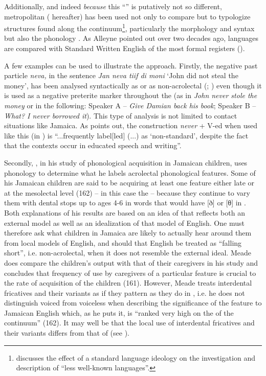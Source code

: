 Additionally, and indeed \textit{because} this “” is putatively not so different, metropolitan  ( hereafter) has been used not only to compare but to typologize structures found along the continuum\footnote{\citet[33 in particular]{Milroy1999} discusses the effect of a standard language ideology on the investigation and description of “less well-known languages”.}, particularly the morphology and syntax but also the phonology \citep[575]{Wells1982c}.  As Alleyne pointed out over two decades ago,  languages are compared with Standard Written English of the most formal registers (\citeyear[16]{Alleyne1980a}).

A few examples can be used to illustrate the approach.  Firstly, the negative past particle \textit{neva,} in the sentence \textit{Jan neva tiif di moni} ‘John did not steal the money’, has been analysed syntactically as  \citep{Bailey1966} or as non-acrolectal (\citealt[141]{Escure2000}; \citealt[217]{Schneider1998}) even though it is used as a negative preterite marker throughout the  (as in \textit{John never stole the money} or in the following: Speaker A -- \textit{Give Damian back his book}; Speaker B -- \textit{What? I never borrowed it}).  This type of analysis is not limited to contact situations like Jamaica.  As \citet[133]{Cheshire1999} points out, the construction \textit{never} + V-ed when used like this (in ) is “...frequently label[led] (...) as ‘non-standard’, despite the fact that the contexts occur in educated speech and writing”.

Secondly, \citet{Meade2001}, in his study of phonological acquisition in Jamaican children, uses  phonology to determine what he labels acrolectal phonological features.  Some of his Jamaican children are said to be acquiring at least one feature either late or at the mesolectal level (162) – in this case the  – because they continue to vary them with dental stops up to ages 4-6 in words that would have [ð] or [θ] in .  Both explanations of his results are based on an idea of  that reflects both an external model as well as an idealization of that model of English.  One must therefore ask what children in Jamaica are likely to actually hear around them from local models of English, and should that English be treated as “falling short”, i.e. non-acrolectal, when it does not resemble the external ideal.  Meade does compare the children’s output with that of their caregivers in his study and concludes that frequency of use by caregivers of a particular feature is crucial to the rate of acquisition of the children (161).  However, Meade treats interdental fricatives and their variants as if they pattern as they do in , i.e. he does not distinguish voiced from voiceless when describing the significance of the feature to Jamaican English which, as he puts it, is “ranked very high on the  of the  continuum” (162).  It may well be that the local use of interdental fricatives and their variants differs from that of  (see ).

